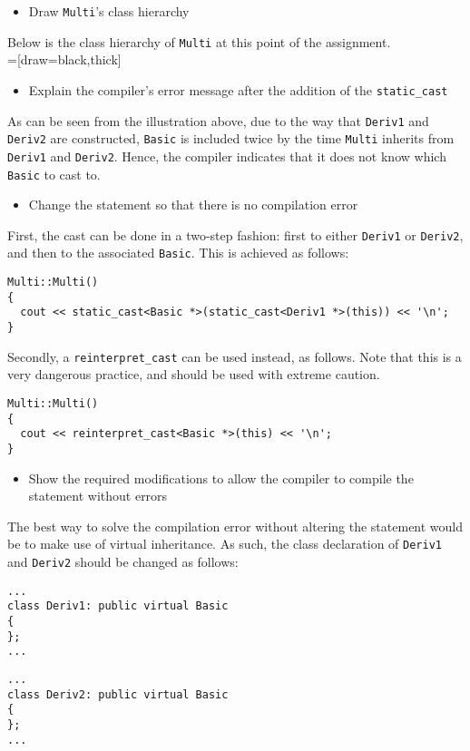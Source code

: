 \begin{itemize}
  \item Draw \texttt{Multi}'s class hierarchy
\end{itemize}
Below is the class hierarchy of \texttt{Multi} at this point of the assignment. \\

=[draw=black,thick]
\tikzset{sibling distance=18pt}

\begin{itemize}
  \item Explain the compiler's error message after the addition of the \texttt{static\_cast}
\end{itemize}

As can be seen from the illustration above, due to the way that \texttt{Deriv1} and \texttt{Deriv2} are constructed, \texttt{Basic} is included twice by the time \texttt{Multi} inherits from \texttt{Deriv1} and \texttt{Deriv2}. Hence, the compiler indicates that it does not know which \texttt{Basic} to cast to.

\begin{itemize}
  \item Change the statement so that there is no compilation error
\end{itemize}
First, the cast can be done in a two-step fashion: first to either \texttt{Deriv1} or \texttt{Deriv2}, and then to the associated \texttt{Basic}. This is achieved as follows:
\begin{lstlisting}[style=in]
Multi::Multi()
{
  cout << static_cast<Basic *>(static_cast<Deriv1 *>(this)) << '\n';
}
\end{lstlisting}

Secondly, a \texttt{reinterpret\_cast} can be used instead, as follows. Note that this is a very dangerous practice, and should be used with extreme caution.
\begin{lstlisting}[style=in]
Multi::Multi()
{
  cout << reinterpret_cast<Basic *>(this) << '\n';
}
\end{lstlisting}

\begin{itemize}
  \item Show the required modifications to allow the compiler to compile the statement without errors
\end{itemize}

The best way to solve the compilation error without altering the statement would be to make use of virtual inheritance. As such, the class declaration of \texttt{Deriv1} and \texttt{Deriv2} should be changed as follows:

\begin{lstlisting}[style=in]
...
class Deriv1: public virtual Basic
{
};
...
\end{lstlisting}
\begin{lstlisting}[style=in]
...
class Deriv2: public virtual Basic
{
};
...
\end{lstlisting}
